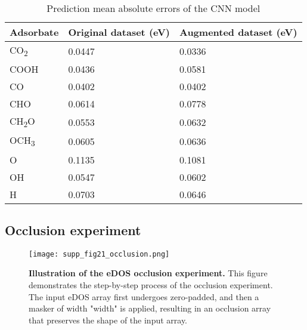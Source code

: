 \begin{table}[htbp]
  \centering
  \begin{tabular}{lll}
    \toprule
    Adsorbate             & Original dataset (eV)  & Augmented dataset (eV)  \\
    \midrule
    CO\textsubscript{2}   & 0.0447                 & 0.0336                  \\
    COOH                  & 0.0436                 & 0.0581                  \\
    CO                    & 0.0402                 & 0.0402                  \\
    CHO                   & 0.0614                 & 0.0778                  \\
    CH\textsubscript{2}O  & 0.0553                 & 0.0632                  \\
    OCH\textsubscript{3}  & 0.0605                 & 0.0636                  \\
    O                     & 0.1135                 & 0.1081                  \\
    OH                    & 0.0547                 & 0.0602                  \\
    H                     & 0.0703                 & 0.0646                  \\
    \bottomrule
  \end{tabular}
  \caption{Prediction mean absolute errors of the CNN model}
  \label{supp_table18:cnn_mae}
\end{table}

\subsection{Occlusion experiment}
\label{supp_sec3.5_occlusion}

\begin{figure}[htbp]
  \centering
  \texttt{[image: supp\_fig21\_occlusion.png]}
  \caption{\textbf{Illustration of the eDOS occlusion experiment.}
  This figure demonstrates the step-by-step process of the occlusion experiment.
  The input eDOS array first undergoes zero-padded, and then a masker of width "width" is applied,
  resulting in an occlusion array that preserves the shape of the input array.}
  \label{supp_fig21:occlusion}
\end{figure}

